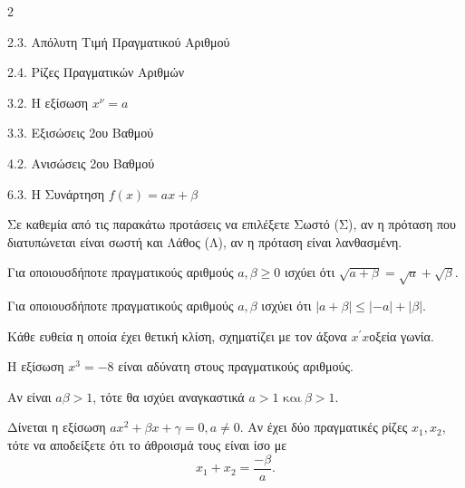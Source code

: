 \begin{ylh}{2}
    \item 2.3. Aπόλυτη Tιμή Πραγματικού Aριθμού
    \item 2.4. Ρίζες Πραγματικών Aριθμών
    \item 3.2. H εξίσωση $x^{\nu}=a$
    \item 3.3. Eξισώσεις 2ου Bαθμού
    \item 4.2. Aνισώσεις 2ου Bαθμού
    \item 6.3. H Συνάρτηση $f(x)=ax+\beta$
\end{ylh}
\begin{alist}
\item 
Σε καθεμία από τις παρακάτω προτάσεις να επιλέξετε Σωστό (Σ), αν η πρόταση που διατυπώνεται είναι σωστή και Λάθος (Λ), αν η πρόταση είναι λανθασμένη.

\begin{rlist}
\item Για οποιουσδήποτε πραγματικούς αριθμούς $a,\beta \geq 0$ ισχύει ότι $\sqrt{a + \beta} = \sqrt{a} + \sqrt{\beta}.$
\item Για οποιουσδήποτε πραγματικούς αριθμούς $a,\beta$ ισχύει ότι $|a + \beta| \leq | - a| + |\beta|.$
\item Kάθε ευθεία η οποία έχει θετική κλίση, σχηματίζει με τον άξονα $x^{'}x$οξεία γωνία.
\item H εξίσωση $x^{3} = - 8$ είναι αδύνατη στους πραγματικούς αριθμούς.
\item Aν είναι $a\beta > 1$, τότε θα ισχύει αναγκαστικά $a > 1\text{ και}\ \beta > 1.$
\end{rlist}
\item Δίνεται η εξίσωση $ax^{2} + \beta x + \gamma = 0,a \neq 0.$ Aν έχει δύο πραγματικές ρίζες $x_{1},x_{2}$, τότε να αποδείξετε ότι το άθροισμά τους είναι ίσο με \[x_{1} + x_{2} = \dfrac{- \beta}{a}.\]
\end{alist}

